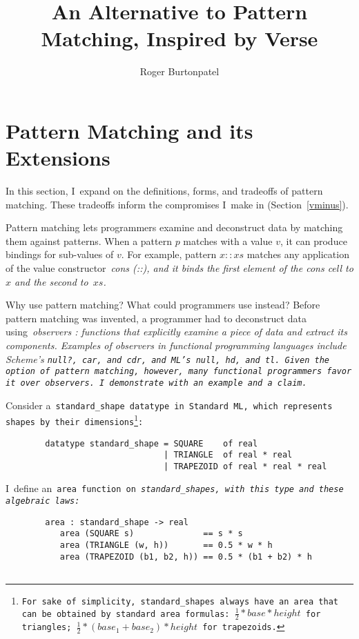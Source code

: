 \documentclass[manuscript,screen 12pt, nonacm]{acmart}
\title{An Alternative to Pattern Matching, Inspired by Verse}
\author{Roger Burtonpatel}
\affiliation{%
  \institution{Tufts University}
  \streetaddress{419 Boston Ave}
  \city{Medford}
  \state{Massachusetts}
  \country{USA}
  \postcode{02155}
}
\begin{document}
\section{Pattern Matching and its Extensions}
\label{pmandextensions}

In this section, I~expand on the definitions, forms, and tradeoffs of pattern
matching. These tradeoffs inform the compromises I~make in \VMinus
(Section~\ref{vminus}).



Pattern matching lets programmers examine and deconstruct data by matching them
against patterns. When a pattern $p$ matches with a value $v$, it can produce
bindings for sub-values of $v$. For example, pattern $x::xs$ matches any 
application of the value constructor~\it{cons} (\it{::}), and it binds the first 
element of the cons cell to $x$ and the second to~$xs$. 

Why use pattern matching? What could programmers use instead? Before pattern
matching was invented, a programmer had to deconstruct data using~\it{observers}
\citep{liskov:abstraction}: functions that explicitly examine a piece of data
and extract its components. Examples of observers in functional programming
languages include Scheme's \tt{null?}, \tt{car}, and~\tt{cdr}, and ML's
\tt{null}, \tt{hd}, and~\tt{tl}. Given the option of pattern matching, however,
many functional programmers favor it over observers. I~demonstrate with an
example and a claim. 

Consider a~\tt{standard\_shape} datatype in Standard ML, which represents shapes
by their dimensions\footnote{For sake of simplicity,~\tt{standard\_shape}s
always have an area that can be obtained by standard area formulas: $\frac{1}{2}
* base * height$ for triangles; $\frac{1}{2} * (base_{1} + base_{2}) * height$
for trapezoids.}: 

\medskip 
\begin{minipage}[t]{\textwidth}
    \begin{verbatim}
        datatype standard_shape = SQUARE    of real 
                                | TRIANGLE  of real * real 
                                | TRAPEZOID of real * real * real
\end{verbatim}
\end{minipage}
\medskip 

I~define an~\tt{area} function on~\it{standard\_shape}s, with this type and these
algebraic laws: 

\medskip 
\begin{minipage}[t]{\textwidth}
    \begin{verbatim}
        area : standard_shape -> real 
           area (SQUARE s)              == s * s 
           area (TRIANGLE (w, h))       == 0.5 * w * h
           area (TRAPEZOID (b1, b2, h)) == 0.5 * (b1 + b2) * h
        
\end{verbatim}
\end{minipage}
\medskip 
\end{document}
